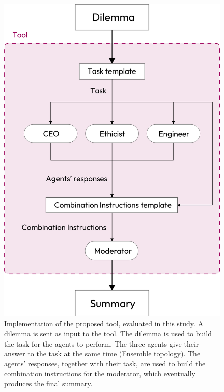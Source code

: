\begin{figure}[h]
  \centering
  \includegraphics[width=\linewidth]{impl}
  \caption{Implementation of the proposed tool, evaluated in this study. A dilemma is sent as input to the tool. The dilemma is used to build the task for the agents to perform. The three agents give their answer to the task at the same time (Ensemble topology). The agents' responses, together with their task, are used to build the combination instructions for the moderator, which eventually produces the final summary.}
  \label{fig:impl}
\end{figure}
